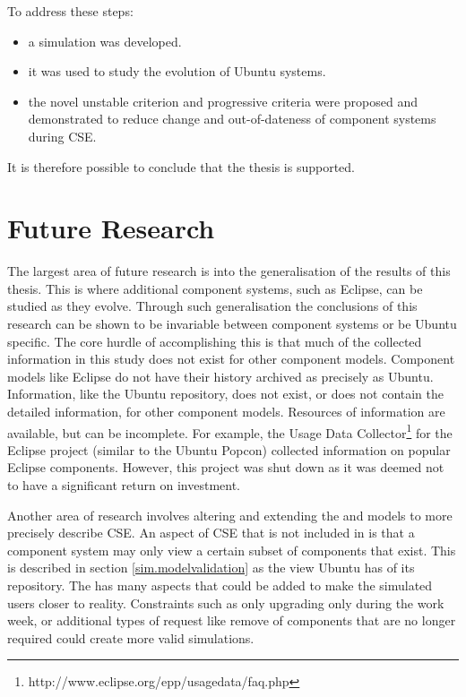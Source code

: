 To address these steps:
\begin{itemize}
  \item a simulation was developed.
  \item it was used to study the evolution of Ubuntu systems.
  \item the novel unstable criterion and progressive criteria  were proposed and demonstrated to reduce change and out-of-dateness of component systems during CSE.
\end{itemize}  

It is therefore possible to conclude that the thesis is supported.
 
\section{Future Research}
\label{conclusion.futurework}
The largest area of future research is into the generalisation of the results of this thesis.
This is where additional component systems, such as Eclipse, can be studied as they evolve. 
Through such generalisation the conclusions of this research can be shown to be invariable between component systems or be Ubuntu specific.
The core hurdle of accomplishing this is that much of the collected information in this study does not exist for other component models.
Component models like Eclipse do not have their history archived as precisely as Ubuntu.
Information, like the Ubuntu repository, does not exist, or does not contain the detailed information, for other component models.
Resources of information are available, but can be incomplete.
For example, the Usage Data Collector\footnote{http://www.eclipse.org/epp/usagedata/faq.php} for the Eclipse project (similar to the Ubuntu Popcon) collected information on popular Eclipse components. 
However, this project was shut down as it was deemed not to have a significant return on investment. 
 
Another area of research involves altering and extending the \modelname and \usermodel models to more precisely describe CSE.
An aspect of CSE that is not included in \modelname is that a component system may only view a certain subset of components that exist.
This is described in section \ref{sim.modelvalidation} as the view Ubuntu has of its repository.
The \usermodel has many aspects that could be added to make the simulated users closer to reality.
Constraints such as only upgrading only during the work week, 
or additional types of request like remove of components that are no longer required could create more valid simulations.

